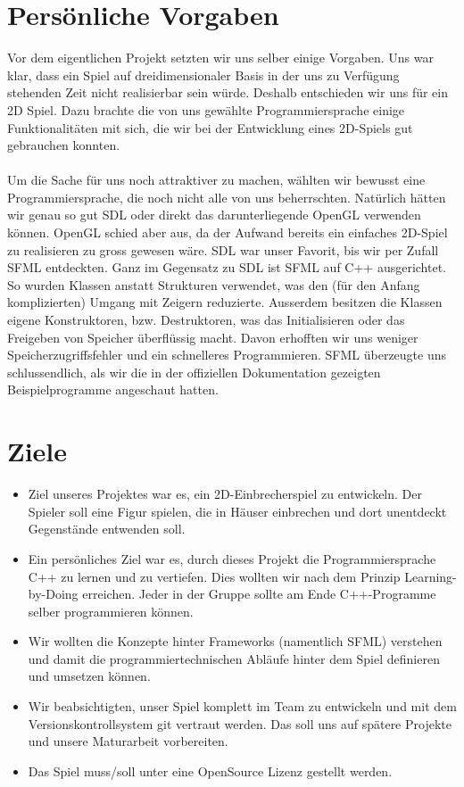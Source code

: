 \documentclass[11pt,a4paper]{scrbook}
\begin{document}
\section{Persönliche Vorgaben}

Vor dem eigentlichen Projekt setzten wir uns selber einige Vorgaben.
Uns war klar, dass ein Spiel auf dreidimensionaler Basis in der uns zu Verfügung stehenden Zeit nicht realisierbar sein würde. Deshalb entschieden wir uns für ein 2D Spiel.
Dazu brachte die von uns gewählte Programmiersprache einige Funktionalitäten mit sich, die wir bei der Entwicklung eines 2D-Spiels gut gebrauchen konnten.\\
\\
Um die Sache für uns noch attraktiver zu machen, wählten wir bewusst eine Programmiersprache, die noch nicht alle von uns beherrschten.
Natürlich hätten wir genau so gut SDL oder direkt das darunterliegende OpenGL verwenden können.
OpenGL schied aber aus, da der Aufwand bereits ein einfaches 2D-Spiel zu realisieren zu gross gewesen wäre.
SDL war unser Favorit, bis wir per Zufall SFML entdeckten.
Ganz im Gegensatz zu SDL ist SFML auf C++ ausgerichtet.
So wurden Klassen anstatt Strukturen verwendet, was den (für den
Anfang komplizierten) Umgang mit Zeigern reduzierte.
Ausserdem besitzen die Klassen eigene Konstruktoren, bzw. Destruktoren, was das Initialisieren
oder das Freigeben von Speicher überflüssig macht.
Davon erhofften wir uns weniger Speicherzugriffsfehler und ein schnelleres Programmieren.
SFML überzeugte uns schlussendlich, als wir die in der offiziellen Dokumentation gezeigten Beispielprogramme angeschaut hatten.

\section{Ziele}
\begin{itemize}
\item
Ziel unseres Projektes war es, ein 2D-Einbrecherspiel zu entwickeln. Der Spieler soll eine Figur spielen, die in Häuser einbrechen und dort unentdeckt Gegenstände entwenden soll.
\item
Ein persönliches Ziel war es, durch dieses Projekt die
Programmiersprache C++ zu lernen und zu vertiefen. Dies wollten wir nach dem Prinzip Learning-by-Doing erreichen. Jeder in der Gruppe sollte am Ende
C++-Programme selber programmieren können.
\item
Wir wollten
die Konzepte hinter Frameworks (namentlich SFML) verstehen und damit die
programmiertechnischen Abläufe hinter dem Spiel definieren und
umsetzen können.
\item
Wir beabsichtigten, unser Spiel komplett im Team zu entwickeln und
mit dem Versionskontrollsystem git vertraut werden. Das soll uns
auf spätere Projekte und unsere Maturarbeit vorbereiten.
\item
Das Spiel muss/soll unter eine OpenSource Lizenz gestellt werden.
\end{itemize}
\end{document}
